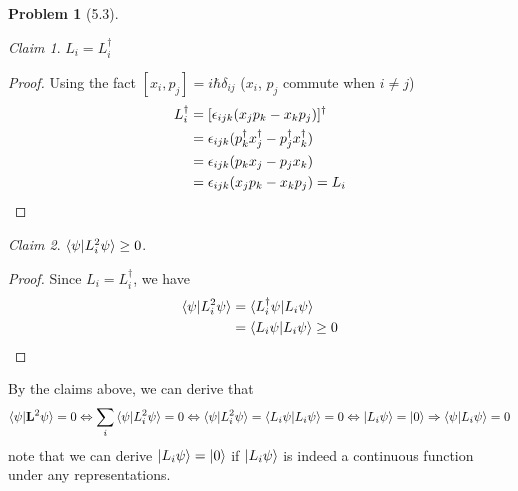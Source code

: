 \documentclass[twoside,11pt]{article}
\theoremstyle{definition}
\newtheorem{problem}{Problem}
\theoremstyle{remark}
\newtheorem*{claim}{Claim}
\begin{document}
\begin{problem}[5.3]
\begin{claim}
    $L_i = L_i^\dagger$
\end{claim}
\begin{proof}
    Using the fact $[x_i,p_j]=i\hbar\delta_{ij}$ ($x_i$, $p_j$ commute when $i\neq j$)
    \begin{align*}
        L_i^\dag &= [\epsilon_{ijk}(x_jp_k - x_kp_j)]^\dag\\
        &= \epsilon_{ijk}(p_k^\dag x_j^\dag - p_j^\dag x_k^\dag)\\
        &= \epsilon_{ijk}(p_k x_j - p_j x_k)\\
        &= \epsilon_{ijk}(x_jp_k - x_kp_j) = L_i\qedhere
    \end{align*}
\end{proof}
\begin{claim}
    $\braket{\psi|L_i^2\psi}\geq 0$.
\end{claim}
\begin{proof}
    Since $L_i=L_i^\dagger$, we have
    \begin{align*}
        \braket{\psi|L_i^2\psi} &= \braket{L_i^\dagger\psi|L_i\psi}\\
        &= \braket{L_i\psi|L_i\psi} \geq 0\qedhere
    \end{align*}
\end{proof}

By the claims above, we can derive that
\begin{align*}
    \braket{\psi|\mathbf{L}^2\psi} = 0\Leftrightarrow
    \sum_{i}\braket{\psi|L_i^2\psi} = 0\Leftrightarrow
    \braket{\psi|L_i^2\psi} = \braket{L_i\psi|L_i\psi} = 0
    \Leftrightarrow \ket{L_i\psi} = \ket{0}\Rightarrow
    \braket{\psi|L_i\psi} = 0
\end{align*}
note that we can derive $\ket{L_i\psi}=\ket{0}$ 
if $\ket{L_i\psi}$ is indeed a continuous function under any
representations.


\end{problem}


\end{document}
